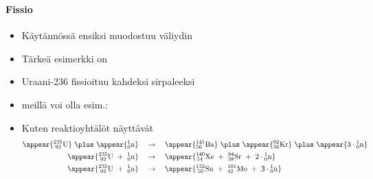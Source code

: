\begin{frame}
\frametitle{\texorpdfstring{\culine[\sectiontitleulinecolor]{\sectiontitle}}{\sectiontitle} }
\framesubtitle{Fissio}
\appear{}

\seminormal
\begin{itemize}[itemsep=1.5mm]
	\item Käytännössä ensiksi muodostuu väliydin

\item Tärkeä esimerkki on 

\item  Uraani-236 fissioituu kahdeksi sirpaleeksi 

\item  {} meillä voi olla esim.: 

\item Kuten reaktioyhtälöt näyttävät
$$
\begin{aligned}
\appear{{ }_{\;92}^{235} \mathrm{U}} ~  \plus  ~ \appear{{ }_{0}^{1} \mathrm{n} } \quad &\rightarrow \quad \appear{{ }_{56}^{141} \mathrm{Ba}} ~  \plus  ~ \appear{{ }_{36}^{92} \mathrm{Kr}} ~  \plus  ~ \appear{3\cdot{ }_{0}^{1} \mathrm{n}}\\
\appear{{ }_{\;92}^{235} \mathrm{U} ~ + ~ { }_{0}^{1} \mathrm{n}} \quad &\rightarrow \quad \appear{{ }_{\,54}^{140} \mathrm{Xe} ~ + ~ { }_{38}^{94} \mathrm{Sr} ~ + ~ 2\cdot{ }_{0}^{1} \mathrm{n}} \\
\appear{{ }^{235}_{\;92} \mathrm{U} ~ + ~ { }_{0}^{1} \mathrm{n}} \quad &\rightarrow \quad \appear{{ }_{\;50}^{132} \mathrm{Sn} ~ + ~ { }_{42}^{101} \mathrm{Mo} ~ + ~ 3\cdot{ }_{0}^{1} \mathrm{n}}
\end{aligned}
$$

\end{itemize}

\endofslide 
\end{frame}


